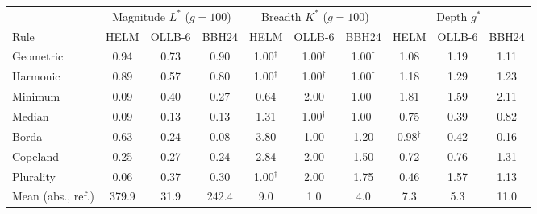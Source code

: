 \begin{tabular}{lccccccccc}\toprule
 & \multicolumn{3}{c}{Magnitude $L^*$ ($g{=}100$)} & \multicolumn{3}{c}{Breadth $K^*$ ($g{=}100$)} & \multicolumn{3}{c}{Depth $g^*$}\\
\cmidrule(lr){2-4}\cmidrule(lr){5-7}\cmidrule(lr){8-10}
Rule & HELM & OLLB-6 & BBH24 & HELM & OLLB-6 & BBH24 & HELM & OLLB-6 & BBH24\\\midrule
Geometric & 0.94 & 0.73 & 0.90 & 1.00$^{\dagger}$ & 1.00$^{\dagger}$ & 1.00$^{\dagger}$ & 1.08 & 1.19 & 1.11\\
Harmonic & 0.89 & 0.57 & 0.80 & 1.00$^{\dagger}$ & 1.00$^{\dagger}$ & 1.00$^{\dagger}$ & 1.18 & 1.29 & 1.23\\
Minimum & 0.09 & 0.40 & 0.27 & 0.64 & 2.00 & 1.00$^{\dagger}$ & 1.81 & 1.59 & 2.11\\
Median & 0.09 & 0.13 & 0.13 & 1.31 & 1.00$^{\dagger}$ & 1.00$^{\dagger}$ & 0.75 & 0.39 & 0.82\\
Borda & 0.63 & 0.24 & 0.08 & 3.80 & 1.00 & 1.20 & 0.98$^{\dagger}$ & 0.42 & 0.16\\
Copeland & 0.25 & 0.27 & 0.24 & 2.84 & 2.00 & 1.50 & 0.72 & 0.76 & 1.31\\
Plurality & 0.06 & 0.37 & 0.30 & 1.00$^{\dagger}$ & 2.00 & 1.75 & 0.46 & 1.57 & 1.13\\
\midrule
Mean (abs., ref.) & 379.9 & 31.9 & 242.4 & 9.0 & 1.0 & 4.0 & 7.3 & 5.3 & 11.0\\
\bottomrule\end{tabular}
